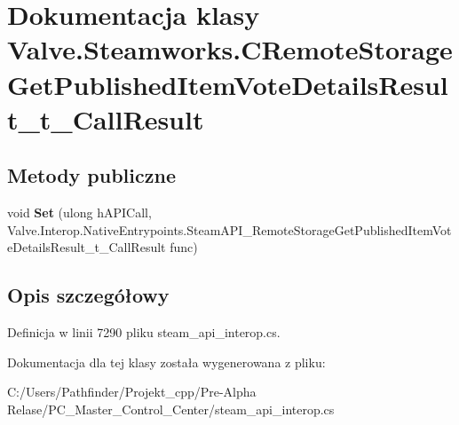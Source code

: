 \hypertarget{class_valve_1_1_steamworks_1_1_c_remote_storage_get_published_item_vote_details_result__t___call_result}{}\section{Dokumentacja klasy Valve.\+Steamworks.\+C\+Remote\+Storage\+Get\+Published\+Item\+Vote\+Details\+Result\+\_\+t\+\_\+\+Call\+Result}
\label{class_valve_1_1_steamworks_1_1_c_remote_storage_get_published_item_vote_details_result__t___call_result}
\subsection*{Metody publiczne}
\begin{DoxyCompactItemize}
\item 
\mbox{\label{class_valve_1_1_steamworks_1_1_c_remote_storage_get_published_item_vote_details_result__t___call_result_a5fd3d52047059a02afcf6c63cfdb4b47}} 
void {\bfseries Set} (ulong h\+A\+P\+I\+Call, Valve.\+Interop.\+Native\+Entrypoints.\+Steam\+A\+P\+I\+\_\+\+Remote\+Storage\+Get\+Published\+Item\+Vote\+Details\+Result\+\_\+t\+\_\+\+Call\+Result func)
\end{DoxyCompactItemize}


\subsection{Opis szczegółowy}


Definicja w linii 7290 pliku steam\+\_\+api\+\_\+interop.\+cs.



Dokumentacja dla tej klasy została wygenerowana z pliku\+:\begin{DoxyCompactItemize}
\item 
C\+:/\+Users/\+Pathfinder/\+Projekt\+\_\+cpp/\+Pre-\/\+Alpha Relase/\+P\+C\+\_\+\+Master\+\_\+\+Control\+\_\+\+Center/steam\+\_\+api\+\_\+interop.\+cs\end{DoxyCompactItemize}
